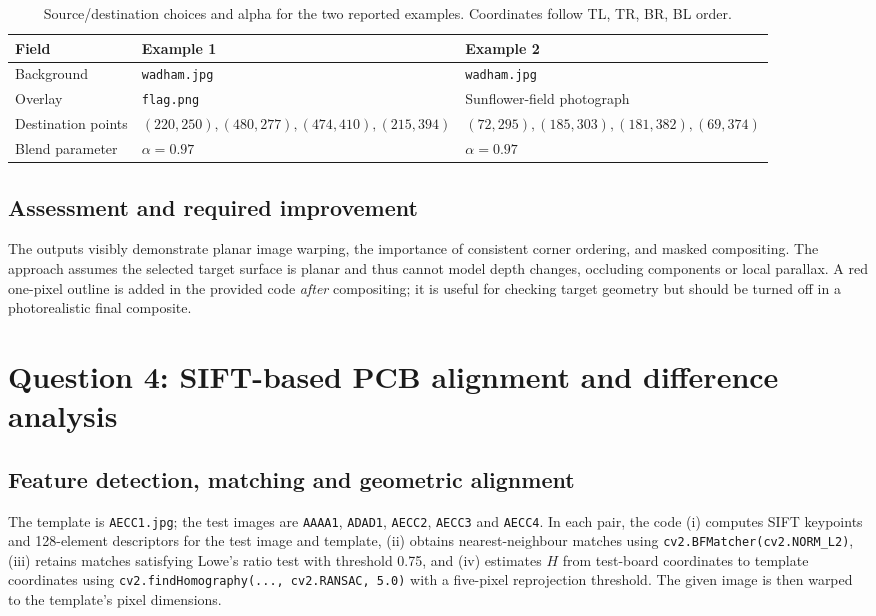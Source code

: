 \documentclass[11pt,a4paper]{article}
\begin{document}
\begin{table}[H]\centering\small
\caption{Source/destination choices and alpha for the two reported examples. Coordinates follow TL, TR, BR, BL order.}
\begin{tabularx}{\linewidth}{@{}lXX@{}}\toprule
Field & Example 1 & Example 2\\\midrule
Background & \texttt{wadham.jpg} & \texttt{wadham.jpg}\\
Overlay & \texttt{flag.png} & Sunflower-field photograph\\
Destination points & $(220,250),(480,277),(474,410),(215,394)$ & $(72,295),(185,303),(181,382),(69,374)$\\
Blend parameter & $\alpha=0.97$ & $\alpha=0.97$\\
\bottomrule\end{tabularx}
\end{table}

\subsection{Assessment and required improvement}
The outputs visibly demonstrate planar image warping, the importance of consistent corner ordering, and masked compositing. The approach assumes the selected target surface is planar and thus cannot model depth changes, occluding components or local parallax. A red one-pixel outline is added in the provided code \emph{after} compositing; it is useful for checking target geometry but should be turned off in a photorealistic final composite.

\section{Question 4: SIFT-based PCB alignment and difference analysis}
\subsection{Feature detection, matching and geometric alignment}
The template is \texttt{AECC1.jpg}; the test images are \texttt{AAAA1}, \texttt{ADAD1}, \texttt{AECC2}, \texttt{AECC3} and \texttt{AECC4}. In each pair, the code (i) computes SIFT keypoints and 128-element descriptors for the test image and template, (ii) obtains nearest-neighbour matches using \texttt{cv2.BFMatcher(cv2.NORM\_L2)}, (iii) retains matches satisfying Lowe's ratio test with threshold 0.75, and (iv) estimates $H$ from test-board coordinates to template coordinates using \texttt{cv2.findHomography(..., cv2.RANSAC, 5.0)} with a five-pixel reprojection threshold. The given image is then warped to the template's pixel dimensions.
\end{document}
